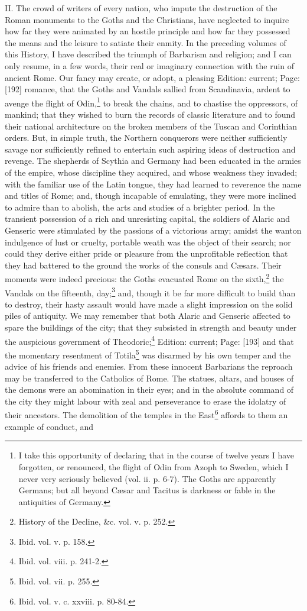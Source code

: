 II. The crowd of writers of every nation, who impute the destruction of the Roman monuments to the Goths and the Christians, have neglected to inquire how far they were animated by an hostile principle and how far they possessed the means and the leisure to satiate their enmity. In the preceding volumes of this History, I have described the triumph of Barbarism and religion; and I can only resume, in a few words, their real or imaginary connection with the ruin of ancient Rome. Our fancy may create, or adopt, a pleasing Edition: current; Page: [192] romance, that the Goths and Vandals sallied from Scandinavia, ardent to avenge the flight of Odin,\footnote{I take this opportunity of declaring that in the course of twelve years I have forgotten, or renounced, the flight of Odin from Azoph to Sweden, which I never very seriously believed (vol. ii. p. 6-7). The Goths are apparently Germans; but all beyond Cæsar and Tacitus is darkness or fable in the antiquities of Germany.} to break the chains, and to chastise the oppressors, of mankind; that they wished to burn the records of classic literature and to found their national architecture on the broken members of the Tuscan and Corinthian orders. But, in simple truth, the Northern conquerors were neither sufficiently savage nor sufficiently refined to entertain such aspiring ideas of destruction and revenge. The shepherds of Scythia and Germany had been educated in the armies of the empire, whose discipline they acquired, and whose weakness they invaded; with the familiar use of the Latin tongue, they had learned to reverence the name and titles of Rome; and, though incapable of emulating, they were more inclined to admire than to abolish, the arts and studies of a brighter period. In the transient possession of a rich and unresisting capital, the soldiers of Alaric and Genseric were stimulated by the passions of a victorious army; amidst the wanton indulgence of lust or cruelty, portable weath was the object of their search; nor could they derive either pride or pleasure from the unprofitable reflection that they had battered to the ground the works of the consuls and Cæsars. Their moments were indeed precious: the Goths evacuated Rome on the sixth,\footnote{History of the Decline, \&c. vol. v. p. 252.} the Vandals on the fifteenth, day;\footnote{Ibid. vol. v. p. 158.} and, though it be far more difficult to build than to destroy, their hasty assault would have made a slight impression on the solid piles of antiquity. We may remember that both Alaric and Genseric affected to spare the buildings of the city; that they subsisted in strength and beauty under the auspicious government of Theodoric;\footnote{Ibid. vol. viii. p. 241-2.} Edition: current; Page: [193] and that the momentary resentment of Totila\footnote{Ibid. vol. vii. p. 255.} was disarmed by his own temper and the advice of his friends and enemies. From these innocent Barbarians the reproach may be transferred to the Catholics of Rome. The statues, altars, and houses of the demons were an abomination in their eyes; and in the absolute command of the city they might labour with zeal and perseverance to erase the idolatry of their ancestors. The demolition of the temples in the East\footnote{Ibid. vol. v. c. xxviii. p. 80-84.} affords to them an example of conduct, and 